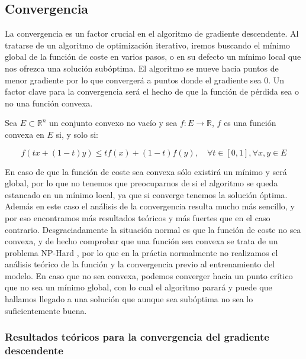 \subsection{Convergencia} \label{sec:convergencia}

La convergencia es un factor crucial en el algoritmo de gradiente descendente. Al tratarse de un algoritmo de optimización iterativo, iremos buscando el mínimo global de la función de coste en varios pasos, o en su defecto un mínimo local que nos ofrezca una solución subóptima. El algoritmo se mueve hacia puntos de menor gradiente por lo que convergerá a puntos donde el gradiente sea 0. Un factor clave para la convergencia será el hecho de que la función de pérdida sea o no una función convexa.




\begin{definicion}
    Sea $E \subset \mathbb{R}^n$ un conjunto convexo no vacío y sea $f:E \rightarrow \mathbb{R}$, $f$ es una función convexa en $E$ si, y solo si:

    $$f(tx + (1-t)y) \leq tf(x) + (1-t) f(y), \quad \forall t \in [0,1], \forall x,y \in E$$
\end{definicion}


En caso de que la función de coste sea convexa sólo existirá un mínimo y será global, por lo que no tenemos que preocuparnos de si el algoritmo se queda estancado en un mínimo local, ya que si converge tenemos la solución óptima. Además en este caso el análisis de la convergencia resulta mucho más sencillo, y por eso encontramos más resultados teóricos y más fuertes que en el caso contrario. Desgraciadamente la situación normal es que la función de coste no sea convexa, y de hecho comprobar que una función sea convexa se trata de un problema NP-Hard \cite{Ahmadi_2011_NP_Convex}, por lo que en la práctia normalmente no realizamos el análisis teórico de la función y la convergencia previo al entrenamiento del modelo. En caso que no sea convexa, podemos converger hacia un punto crítico que no sea un mínimo global, con lo cual el algoritmo parará y puede que hallamos llegado a una solución que aunque sea subóptima no sea lo suficientemente buena.



\subsubsection{Resultados teóricos para la convergencia del gradiente descendente}

